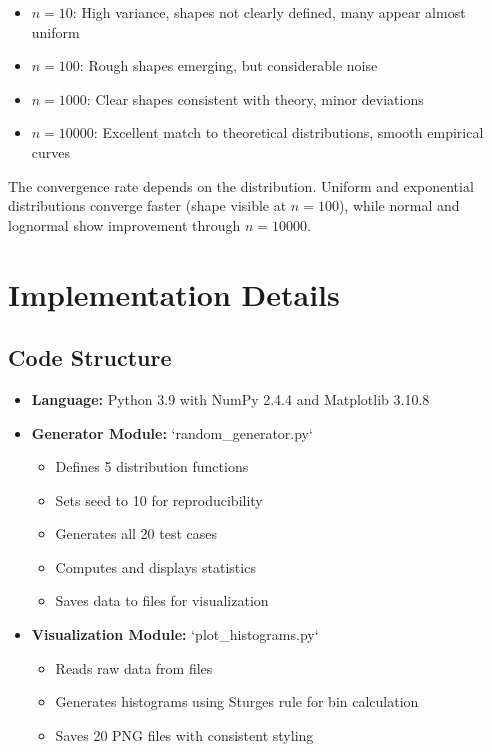 \documentclass[12pt]{article}
\begin{document}
\begin{itemize}
    \item $n=10$: High variance, shapes not clearly defined, many appear almost uniform
    \item $n=100$: Rough shapes emerging, but considerable noise
    \item $n=1000$: Clear shapes consistent with theory, minor deviations
    \item $n=10000$: Excellent match to theoretical distributions, smooth empirical curves
\end{itemize}

The convergence rate depends on the distribution. Uniform and exponential distributions converge faster (shape visible at $n=100$), while normal and lognormal show improvement through $n=10000$.

\section{Implementation Details}

\subsection{Code Structure}

\begin{itemize}
    \item \textbf{Language:} Python 3.9 with NumPy 2.4.4 and Matplotlib 3.10.8
    \item \textbf{Generator Module:} `random\_generator.py`
    \begin{itemize}
        \item Defines 5 distribution functions
        \item Sets seed to 10 for reproducibility
        \item Generates all 20 test cases
        \item Computes and displays statistics
        \item Saves data to files for visualization
    \end{itemize}
    \item \textbf{Visualization Module:} `plot\_histograms.py`
    \begin{itemize}
        \item Reads raw data from files
        \item Generates histograms using Sturges rule for bin calculation
        \item Saves 20 PNG files with consistent styling
    \end{itemize}
\end{itemize}
\end{document}
